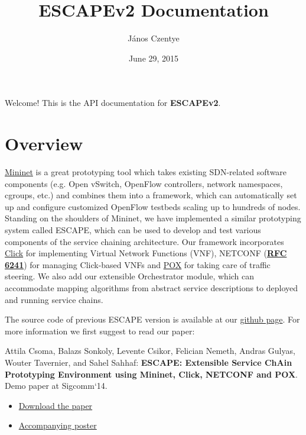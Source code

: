 \documentclass[letterpaper,10pt,english]{sphinxmanual}
\title{ESCAPEv2 Documentation}
\date{June 29, 2015}
\author{János Czentye}
\begin{document}
\maketitle
\tableofcontents
{}\label{index::doc}


Welcome! This is the API documentation for \textbf{ESCAPEv2}.


\chapter{Overview}
\label{index:welcome-to-escapev2-s-documentation}\label{index:overview}
\href{http://mininet.org/}{Mininet} is a great prototyping tool which takes
existing SDN-related software components (e.g. Open vSwitch, OpenFlow
controllers, network namespaces, cgroups, etc.) and combines them into a
framework, which can automatically set up and configure customized OpenFlow
testbeds scaling up to hundreds of nodes. Standing on the shoulders of Mininet,
we have implemented a similar prototyping system called ESCAPE, which can be
used to develop and test various components of the service chaining
architecture. Our framework incorporates
\href{http://www.read.cs.ucla.edu/click/}{Click} for implementing Virtual Network
Functions (VNF), NETCONF (\href{https://tools.ietf.org/html/rfc6241.html}{\textbf{RFC 6241}}) for managing Click-based VNFs and
\href{https://openflow.stanford.edu/display/ONL/POX+Wiki}{POX} for taking care of
traffic steering. We also add our extensible Orchestrator module, which can
accommodate mapping algorithms from abstract service descriptions to deployed
and running service chains.




The source code of previous ESCAPE version is available at our \href{https://github.com/nemethf/escape}{github page}. For more information we first suggest
to read our paper:

Attila Csoma, Balazs Sonkoly, Levente Csikor, Felician Nemeth, Andras Gulyas,
Wouter Tavernier, and Sahel Sahhaf: \textbf{ESCAPE: Extensible Service ChAin
Prototyping Environment using Mininet, Click, NETCONF and POX}.
Demo paper at Sigcomm`14.
\begin{itemize}
\item {} 
\href{http://dl.acm.org/authorize?N71297}{Download the paper}

\item {} 
\href{http://sb.tmit.bme.hu/mediawiki/images/b/ba/Sigcomm2014\_poster.png}{Accompanying poster}

\end{itemize}
\end{document}
